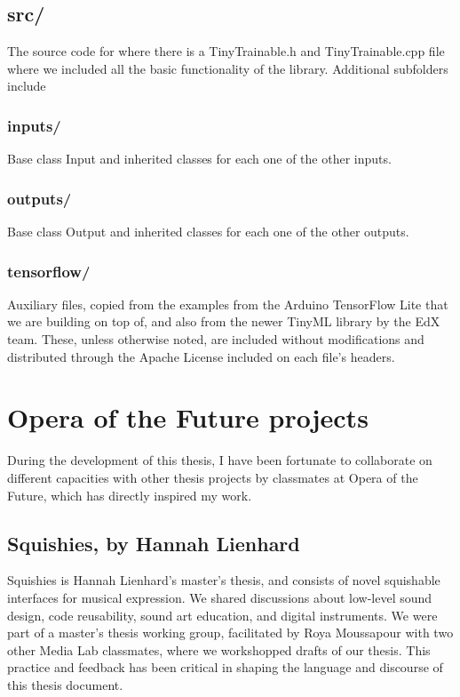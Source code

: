 \subsection{src/}

The source code for where there is a TinyTrainable.h and TinyTrainable.cpp file where we included all the basic functionality of the library. Additional subfolders include

\subsubsection{inputs/}

Base class Input and inherited classes for each one of the other inputs.

\subsubsection{outputs/}

Base class Output and inherited classes for each one of the other outputs.

\subsubsection{tensorflow/}

Auxiliary files, copied from the examples from the Arduino TensorFlow Lite that we are building on top of, and also from the newer TinyML library by the EdX team. These, unless otherwise noted, are included without modifications and distributed through the Apache License included on each file's headers.

\section{Opera of the Future projects}

During the development of this thesis, I have been fortunate to collaborate on different capacities with other thesis projects by classmates at Opera of the Future, which has directly inspired my work.

\subsection{Squishies, by Hannah Lienhard}

Squishies is Hannah Lienhard's master's thesis, and consists of novel squishable interfaces for musical expression. We shared discussions about low-level sound design, code reusability, sound art education, and digital instruments. We were part of a master's thesis working group, facilitated by Roya Moussapour with two other Media Lab classmates, where we workshopped drafts of our thesis. This practice and feedback has been critical in shaping the language and discourse of this thesis document.

